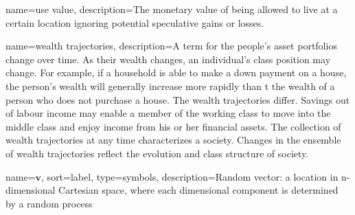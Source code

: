{
name=use value,
description={The monetary value of being allowed to live at a certain location ignoring potential speculative gains or losses.}
}

{
name=wealth trajectories,
description={A term for the people's  asset portfolios change over time. As their \gls{wealth} changes, an individual's \gls{class} position may change. For example, if a household is able to make  a down payment on a house,  the person's wealth will generally increase more rapidly than t the wealth of a person who does not purchase a house. The wealth trajectories differ. Savings out of labour income may enable a member of the \gls{working class} to move into the \gls{middle class} and enjoy income from his or her financial assets. The collection  of wealth trajectories at any time characterizes a society. Changes in the ensemble of wealth trajectories reflect the evolution and class structure of society.   } 
}








{
name={$\mathbf{v}$},
sort={label},
type=symbols,
description={Random vector: a location in n-dimensional Cartesian space, where each dimensional component is determined by a random process}
}